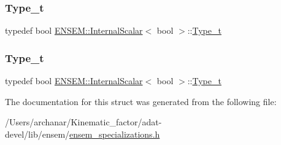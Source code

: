 \mbox{\label{structENSEM_1_1InternalScalar_3_01bool_01_4_a3fe5fad0f8af43221744c3ddb40131a0}} 
\subsubsection{\texorpdfstring{Type\_t}{Type\_t}\hspace{0.1cm}{\footnotesize\ttfamily [2/3]}}
{\footnotesize\ttfamily typedef bool \mbox{\hyperlink{structENSEM_1_1InternalScalar}{E\+N\+S\+E\+M\+::\+Internal\+Scalar}}$<$ bool $>$\+::\mbox{\hyperlink{structENSEM_1_1InternalScalar_3_01bool_01_4_a3fe5fad0f8af43221744c3ddb40131a0}{Type\+\_\+t}}}

\mbox{\label{structENSEM_1_1InternalScalar_3_01bool_01_4_a3fe5fad0f8af43221744c3ddb40131a0}} 
\subsubsection{\texorpdfstring{Type\_t}{Type\_t}\hspace{0.1cm}{\footnotesize\ttfamily [3/3]}}
{\footnotesize\ttfamily typedef bool \mbox{\hyperlink{structENSEM_1_1InternalScalar}{E\+N\+S\+E\+M\+::\+Internal\+Scalar}}$<$ bool $>$\+::\mbox{\hyperlink{structENSEM_1_1InternalScalar_3_01bool_01_4_a3fe5fad0f8af43221744c3ddb40131a0}{Type\+\_\+t}}}



The documentation for this struct was generated from the following file\+:\begin{DoxyCompactItemize}
\item 
/\+Users/archanar/\+Kinematic\+\_\+factor/adat-\/devel/lib/ensem/\mbox{\hyperlink{adat-devel_2lib_2ensem_2ensem__specializations_8h}{ensem\+\_\+specializations.\+h}}\end{DoxyCompactItemize}
